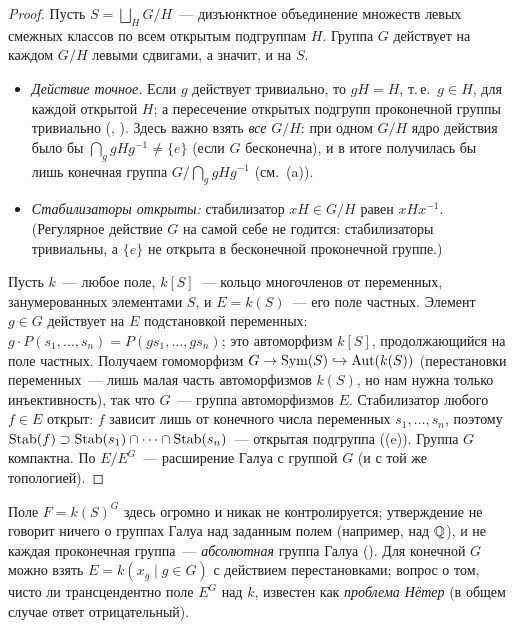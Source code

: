 \begin{proof}
Пусть $S=\bigsqcup_HG/H$~--- дизъюнктное объединение множеств левых смежных классов по всем открытым подгруппам $H$. Группа
$G$ действует на каждом $G/H$ левыми сдвигами, а значит, и на $S$.
\begin{itemize}[leftmargin=*]
\item \emph{Действие точное.} Если $g$ действует тривиально, то $gH=H$, т.\,е.\ $g\in H$, для каждой открытой $H$; а
пересечение открытых подгрупп проконечной группы тривиально (, ). Здесь важно взять \emph{все} $G/H$: при одном $G/H$
ядро действия было бы $\bigcap_ggHg^{-1}\ne\{e\}$ (если $G$ бесконечна), и в итоге получилась бы лишь конечная группа
$G/\bigcap_ggHg^{-1}$ (см.\ (a)).
\item \emph{Стабилизаторы открыты:} стабилизатор $xH\in G/H$ равен $xHx^{-1}$. (Регулярное действие $G$ на самой себе не
годится: стабилизаторы тривиальны, а $\{e\}$ не открыта в бесконечной проконечной группе.)
\end{itemize}
Пусть $k$~--- любое поле, $k[S]$~--- кольцо многочленов от переменных, занумерованных элементами $S$, и $E=k(S)$~---
его поле частных. Элемент $g\in G$ действует на $E$ подстановкой переменных:
$g\cdot P(s_1,\dots,s_n)=P(gs_1,\dots,gs_n)$; это автоморфизм $k[S]$, продолжающийся на поле частных. Получаем
гомоморфизм $G\to\operatorname{Sym}(S)\hookrightarrow\operatorname{Aut}(k(S))$ (перестановки переменных~--- лишь малая часть автоморфизмов $k(S)$,
но нам нужна только инъективность), так что $G$~--- группа автоморфизмов $E$. Стабилизатор любого $f\in E$ открыт: $f$
зависит лишь от конечного числа переменных $s_1,\dots,s_n$, поэтому
$\operatorname{Stab}(f)\supset\operatorname{Stab}(s_1)\cap\dots\cap\operatorname{Stab}(s_n)$~--- открытая подгруппа ((e)). Группа $G$ компактна. По 
$E/E^G$~--- расширение Галуа с группой $G$ (и с той же топологией).
\end{proof}

\begin{remark}
Поле $F=k(S)^G$ здесь огромно и никак не контролируется; утверждение не говорит ничего о группах Галуа над заданным полем
(например, над $\mathbb Q$), и не каждая проконечная группа~--- \emph{абсолютная} группа Галуа (). Для конечной $G$ можно
взять $E=k(x_g\mid g\in G)$ с действием перестановками; вопрос о том, чисто ли трансцендентно поле $E^G$ над $k$, известен
как \emph{проблема Нётер} (в общем случае ответ отрицательный).
\end{remark}
